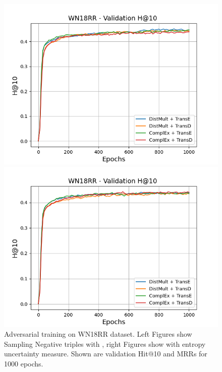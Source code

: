 \begin{figure}[H]
\begin{minipage}{.5\textwidth}
    \end{minipage}
    \begin{minipage}{.5\textwidth}
      \centering
      \includegraphics[width=0.9\linewidth]{figures/results/gan_train/not_pretrained/random/wn18rr/epochs1000/random_wn18rr_hit10.png}
    \end{minipage}%
    \begin{minipage}{.5\textwidth}
      \centering
      \includegraphics[width=0.9\linewidth]{figures/results/gan_train/not_pretrained/uncertainty/max_distribution/entropy/wn18rr/1k_epochs/uncertainty_wn18rr_hit10.png}
    \end{minipage}%
    \caption{Adversarial training on \textsc{WN18RR} dataset. 
    Left Figures show Sampling Negative triples with \origsampling, right Figures show \ussoftmax with entropy uncertainty measure.
    Shown are validation Hit@10 and MRRs for 1000 epochs.}
    \label{fig:advtrain_wn18rr_random_vs_uncertainty}
\end{figure}

